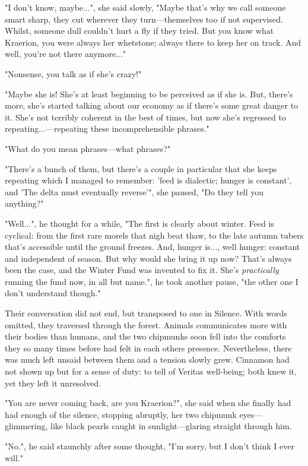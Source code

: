"I don't know, maybe...", she said slowly, "Maybe that's why we call someone smart sharp, they cut wherever they turn---themselves too if not supervised. Whilst, someone dull couldn't hurt a fly if they tried. But you know what Kraerion, you were always her whetstone; always there to keep her on track. And well, you're not there anymore..."

"Nonsense, you talk as if she's crazy!"

"Maybe she is! She's at least beginning to be perceived as if she is. But, there's more, she's started talking about our economy as if there's some great danger to it. She's not terribly coherent in the best of times, but now she's regressed to repeating...---repeating these incomprehensible phrases."

"What do you mean phrases---what phrases?"

"There's a bunch of them, but there's a couple in particular that she keeps repeating which I managed to remember: 'feed is dialectic; hunger is constant', and 'The delta must eventually reverse'", she paused, "Do they tell you anything?"

"Well...", he thought for a while, "The first is clearly about winter. Feed is cyclical: from the first rare morels that nigh beat thaw, to the late autumn tubers that's accessible until the ground freezes. And, hunger is..., well hunger: constant and independent of season. But why would she bring it up now? That's always been the case, and the Winter Fund was invented to fix it. She's \textit{practically} running the fund now, in all but name.", he took another pause, "the other one I don't understand though."

Their conversation did not end, but transposed to one in Silence. With words omitted, they traversed through the forest. Animals communicates more with their bodies than humans, and the two chipmunks soon fell into the comforts they so many times before had felt in each others presence. Nevertheless, there was much left unsaid between them and a tension slowly grew. Cinnamon had not shown up but for a sense of duty: to tell of Veritas well-being; both knew it, yet they left it unresolved.

"You are never coming back, are you Kraerion?", she said when she finally had had enough of the silence, stopping abruptly, her two chipmunk eyes---glimmering, like black pearls caught in sunlight---glaring straight through him.

"No.", he said staunchly after some thought, "I'm sorry, but I don't think I ever will."

